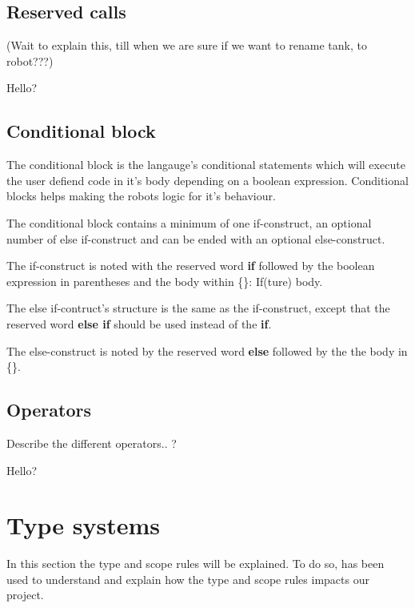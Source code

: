 \subsection{Reserved calls}
(Wait to explain this, till when we are sure if we want to rename tank, to robot???)

\begin{defi}
Hello?
\end{defi}

\subsection{Conditional block}
The conditional block is the langauge's conditional statements which will execute the user defiend code in it's body depending on a boolean expression. Conditional blocks helps making the robots logic for it's behaviour. 

\begin{defi}
The conditional block contains a minimum of one if-construct, an optional number of else if-construct and can be ended with an optional else-construct. 

The if-construct is noted with the reserved word \textbf{if} followed by the boolean expression in parentheses and the body within \{\}: If(ture) {body}.

The else if-contruct's structure is the same as the if-construct, except that the reserved  word \textbf{else if} should be used instead of the \textbf{if}. 

The else-construct is noted by the reserved word \textbf{else} followed by the the body in \{\}.
\end{defi}

\subsection{Operators}
Describe the different operators.. ? 

\begin{defi}
Hello?
\end{defi}

\section{Type systems}
In this section the type and scope rules will be explained. To do so, \cite{Sebesta} has been used to understand and explain how the type and scope rules impacts our project.

